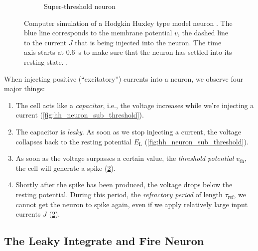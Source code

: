 \documentclass[10pt,letterpaper,oneside]{article}
\begin{document}
\begin{figure}
\begin{subfigure}{0.5\textwidth}
		\caption{Super-threshold neuron}%
		\label{fig:hh_neuron_super_threshold}
	\end{subfigure}%
	\caption{Computer simulation of a Hodgkin Huxley type model neuron \cite{hodgkin1952quantitative,traub1991neuronal}. The blue line corresponds to the membrane potential $v$, the dashed line to the current $J$ that is being injected into the neuron. The time axis starts at \SI{0.6}{\second} to make sure that the neuron has settled into its resting state. , }
\end{figure}

When injecting positive (\enquote{excitatory}) currents into a neuron, we observe four major things:
\begin{enumerate}
	\item The cell acts like a \emph{capacitor}, i.e., the voltage increases while we're injecting a current (\cref{fig:hh_neuron_sub_threshold}).
	\item The capacitor is \emph{leaky}. As soon as we stop injecting a current, the voltage collapses back to the resting potential $E_\mathrm{L}$ (\cref{fig:hh_neuron_sub_threshold}).
	\item As soon as the voltage surpasses a certain value, the \emph{threshold potential} $v_\mathrm{th}$, the cell will generate a spike (\cref{fig:hh_neuron_super_threshold}).
	\item Shortly after the spike has been produced, the voltage drops below the resting potential. During this period, the \emph{refractory period} of length $\tau_\mathrm{ref}$, we cannot get the neuron to spike again, even if we apply relatively large input currents $J$ (\cref{fig:hh_neuron_super_threshold}).
\end{enumerate}

\newpage


\subsection{The Leaky Integrate and Fire Neuron}
\end{document}
